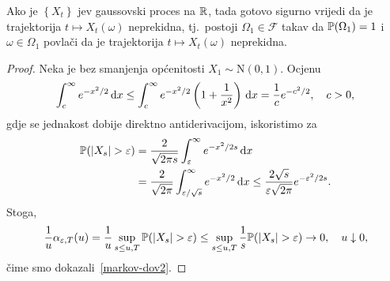 \documentclass[main.tex]{subfiles}
\begin{document}
\begin{teorem}\label{tm:aditgauss}
	Ako je \( \left\{ X_t \right\} \) \levy jev gaussovski proces na \( \R \), tada gotovo sigurno vrijedi da je trajektorija \( t \mapsto X_t(\omega) \) neprekidna, tj.\ postoji \( \Omega_1 \in \mathcal F \) takav da \( \P(\Omega_1)=1 \) i \( \omega\in \Omega_1\) povlači da je trajektorija \( t \mapsto X_t(\omega) \) neprekidna.
\end{teorem}

\begin{proof}
	Neka je bez smanjenja općenitosti \( X_1 \sim \mathrm N(0,1) \). Ocjenu
	\[
		\int_c^\infty e^{-{x^2}/2} \D x \le
		\int_c^\infty e^{-{x^2}/2} \left( 1 + \frac 1{x^2} \right) \D x
		= \frac 1c e^{-{c^2}/2}, \quad c > 0,
	\]
	gdje se jednakost dobije direktno antiderivacijom, iskoristimo za
	\begin{align}
		\P(\abs{X_s} > \varepsilon) & = \frac 2{\sqrt{2\pi s}} \int_\varepsilon^\infty e^{-x^2/{2s}} \D x         \\
		                            & = \frac 2{\sqrt{2 \pi}} \int_{\varepsilon/\sqrt s}^\infty e^{-{x^2}/2} \D x
		\le \frac{2 \sqrt s}{\varepsilon \sqrt{2\pi}} e^{-\varepsilon^2/{2s}}.
	\end{align}
	Stoga,
	\begin{equation}
		\frac 1u \alpha_{\varepsilon, T}(u) =
		\frac 1u \sup\limits_{s \le u, T} \P(\abs{X_s} > \varepsilon) \le
		\sup\limits_{s \le u, T} \frac 1s \P(\abs{X_s} > \varepsilon) \un, \quad u \downarrow 0,
	\end{equation}
	čime smo dokazali~\eqref{markov-dov2}.
\end{proof}
\end{document}
